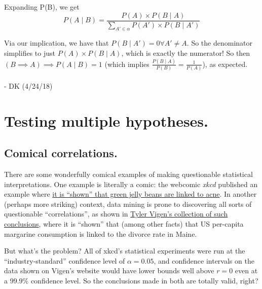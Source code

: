 \documentclass[../main/main.tex]{subfiles}
\begin{document}
Expanding P(B), we get
\[ P(A \mid B) = 
  \frac{P(A) \times P(B \mid A)} {\sum_{A' \in \alpha} P(A') \times P(B \mid A')} \]

Via our implication, we have that \(P(B \mid A') = 0 \forall A' \neq A\).
So the denominator simplifies to just \(P(A) \times P(B \mid A)\), which is exactly the
numerator! So then \(\left(B \implies A\right) \implies P(A \mid B) = 1\) (which implies
\( \frac {P(B \mid A)} {P(B)} = \frac {1} {P(A)} \)), as expected.
\\
\\
- DK (4/24/18)

\newpage

\section{Testing multiple hypotheses.}

\subsection{Comical correlations.}

There are some wonderfully comical examples of making questionable statistical
interpretations.
One example is literally a comic: the webcomic \textit{xkcd} published an example where
\href{https://xkcd.com/882/}{it is ``shown'' that green jelly beans are linked to acne}.
In another (perhaps more striking) context,
data mining is prone to discovering all sorts of questionable 
``correlations'', as shown in 
\href{http://www.tylervigen.com/spurious-correlations}{Tyler Vigen's collection
of such conclusions}, where it is ``shown'' that (among other facts) 
that US per-capita margarine consumption
is linked to the divorce rate in Maine.\par

But what's the problem? All of xkcd's statistical experiments were run
at the ``industry-standard'' confidence level of \(\alpha = 0.05\),
and confidence intervals on the data shown
on Vigen's website would have lower bounds well above \(r = 0\) 
even at a 99.9\% confidence level.
So the conclusions made in both are totally valid, right?\par
\end{document}
